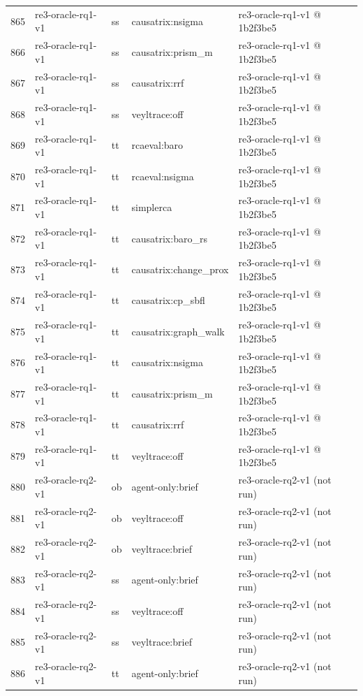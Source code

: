 \begin{longtable}{@{}r>{\raggedright\arraybackslash}p{87.0pt}>{\raggedright\arraybackslash}p{18.0pt}>{\raggedright\arraybackslash}p{63.0pt}>{\raggedright\arraybackslash}p{108.0pt}@{}}
865 & re3-oracle-rq1-v1 & ss & causatrix:nsigma & re3-oracle-rq1-v1 @ 1b2f3be5 \\
866 & re3-oracle-rq1-v1 & ss & causatrix:prism\_m & re3-oracle-rq1-v1 @ 1b2f3be5 \\
867 & re3-oracle-rq1-v1 & ss & causatrix:rrf & re3-oracle-rq1-v1 @ 1b2f3be5 \\
868 & re3-oracle-rq1-v1 & ss & veyltrace:off & re3-oracle-rq1-v1 @ 1b2f3be5 \\
869 & re3-oracle-rq1-v1 & tt & rcaeval:baro & re3-oracle-rq1-v1 @ 1b2f3be5 \\
870 & re3-oracle-rq1-v1 & tt & rcaeval:nsigma & re3-oracle-rq1-v1 @ 1b2f3be5 \\
871 & re3-oracle-rq1-v1 & tt & simplerca & re3-oracle-rq1-v1 @ 1b2f3be5 \\
872 & re3-oracle-rq1-v1 & tt & causatrix:baro\_rs & re3-oracle-rq1-v1 @ 1b2f3be5 \\
873 & re3-oracle-rq1-v1 & tt & causatrix:change\_prox & re3-oracle-rq1-v1 @ 1b2f3be5 \\
874 & re3-oracle-rq1-v1 & tt & causatrix:cp\_sbfl & re3-oracle-rq1-v1 @ 1b2f3be5 \\
875 & re3-oracle-rq1-v1 & tt & causatrix:graph\_walk & re3-oracle-rq1-v1 @ 1b2f3be5 \\
876 & re3-oracle-rq1-v1 & tt & causatrix:nsigma & re3-oracle-rq1-v1 @ 1b2f3be5 \\
877 & re3-oracle-rq1-v1 & tt & causatrix:prism\_m & re3-oracle-rq1-v1 @ 1b2f3be5 \\
878 & re3-oracle-rq1-v1 & tt & causatrix:rrf & re3-oracle-rq1-v1 @ 1b2f3be5 \\
879 & re3-oracle-rq1-v1 & tt & veyltrace:off & re3-oracle-rq1-v1 @ 1b2f3be5 \\
880 & re3-oracle-rq2-v1 & ob & agent-only:brief & re3-oracle-rq2-v1 (not run) \\
881 & re3-oracle-rq2-v1 & ob & veyltrace:off & re3-oracle-rq2-v1 (not run) \\
882 & re3-oracle-rq2-v1 & ob & veyltrace:brief & re3-oracle-rq2-v1 (not run) \\
883 & re3-oracle-rq2-v1 & ss & agent-only:brief & re3-oracle-rq2-v1 (not run) \\
884 & re3-oracle-rq2-v1 & ss & veyltrace:off & re3-oracle-rq2-v1 (not run) \\
885 & re3-oracle-rq2-v1 & ss & veyltrace:brief & re3-oracle-rq2-v1 (not run) \\
886 & re3-oracle-rq2-v1 & tt & agent-only:brief & re3-oracle-rq2-v1 (not run) \\

\end{longtable}
